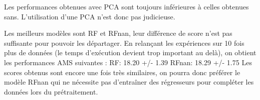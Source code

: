 \documentclass[12pt]{article}
\begin{document}

\begin{table}[H]
    \center
    \caption{Performances obtenues avec chaque méthode (avec PCA)}
    \label{tab:ensemble-results-pca}
\end{table}

Les performances obtenues avec PCA sont toujours inférieures à celles obtenues sans.
L'utilisation d'une PCA n'est donc pas judicieuse.




Les meilleurs modèles sont RF et RFnan, leur différence de score
n'est pas suffisante pour pouvoir les départager.
En relançant les expériences sur 10 fois plus de données
(le temps d'exécution devient trop important au delà),
on obtient les performances AMS suivantes :
RF:     18.20 +/- 1.39
RFnan:  18.29 +/- 1.75
Les scores obtenus sont encore une fois très similaires, on pourra donc préférer le modèle RFnan
qui ne nécessite pas d'entraîner des régresseurs pour compléter les données lors du prétraitement. 
\end{document}
